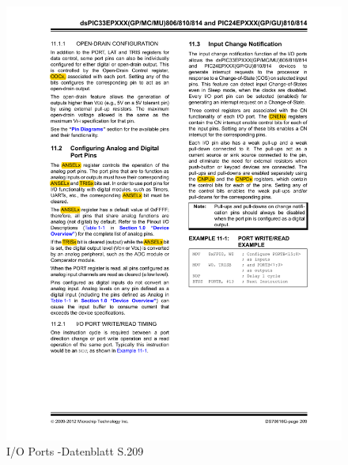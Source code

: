\begin{figure}[!h]
	\centering
	\includegraphics[width=\textwidth]{Images/page209}
	\caption[I/O Ports]{I/O Ports -Datenblatt S.209}
	\label{image:page209}
\end{figure}

